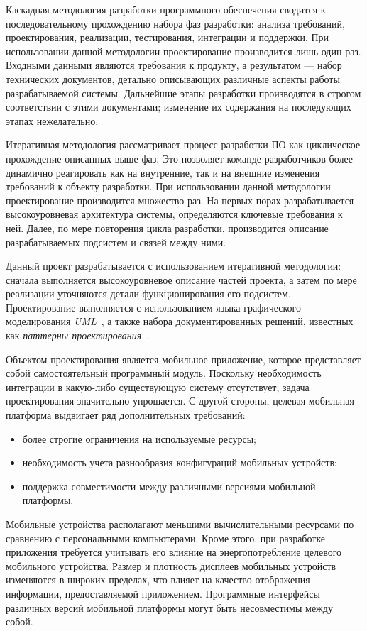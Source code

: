 Каскадная методология разработки программного обеспечения сводится
к последовательному прохождению набора фаз разработки:
анализа требований, проектирования, реализации, тестирования, интеграции и поддержки.
При использовании данной методологии проектирование производится
лишь один раз. Входными данными являются требования к продукту,
а результатом --- набор технических документов, детально описывающих
различные аспекты работы разрабатываемой системы.
Дальнейшие этапы разработки производятся в строгом соответствии с этими документами;
изменение их содержания на последующих этапах нежелательно.

Итеративная методология рассматривает процесс разработки ПО как
циклическое прохождение описанных выше фаз.
Это позволяет команде разработчиков более динамично реагировать
как на внутренние, так и на внешние изменения требований к объекту разработки.
При использовании данной методологии проектирование производится множество раз.
На первых порах разрабатывается высокоуровневая архитектура системы,
определяются ключевые требования к ней. Далее, по мере повторения цикла
разработки, производится описание разрабатываемых подсистем и связей между ними.

Данный проект разрабатывается с использованием итеративной методологии:
сначала выполняется высокоуровневое описание частей проекта,
а затем по мере реализации уточняются детали функционирования его подсистем.
Проектирование выполняется с использованием языка графического
моделирования \textit{UML}~\cite{fowler04}, а также набора документированных решений,
известных как \textit{паттерны проектирования}~\cite{gamma01}.

Объектом проектирования является мобильное приложение,
которое представляет собой самостоятельный программный модуль.
Поскольку необходимость интеграции в какую-либо существующую
систему отсутствует, задача проектирования значительно упрощается.
С другой стороны, целевая мобильная платформа выдвигает ряд дополнительных
требований:
\begin{itemize}
\item более строгие ограничения на используемые ресурсы;
\item необходимость учета разнообразия конфигураций мобильных устройств;
\item поддержка совместимости между различными версиями
  мобильной платформы.
\end{itemize}

Мобильные устройства располагают меньшими вычислительными
ресурсами по сравнению с персональными компьютерами.
Кроме этого, при разработке приложения
требуется учитывать его влияние на энергопотребление
целевого мобильного устройства.
Размер и плотность дисплеев мобильных устройств изменяются в широких пределах,
что влияет на качество отображения информации, предоставляемой приложением.
Программные интерфейсы различных версий мобильной платформы
могут быть несовместимы между собой.

